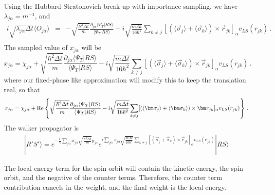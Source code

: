 Using the Hubbard-Stratonovich break up with importance sampling, we have
$\lambda_{j\alpha} = m^{-1}$, and
\begin{eqnarray}
i\sqrt{\lambda_{j\alpha}\Delta t}\langle O_{j\alpha} \rangle
&=& -\sqrt{\frac{\hbar^2 \Delta t}{m}}
\frac{\partial_{j\alpha} \langle \Psi_T |RS\rangle}
{\langle \Psi_T |RS\rangle} +i \sqrt{\frac{m \Delta t}{16 \hbar^2}}
\sum_{k\neq j}[(\langle \vec \sigma_j\rangle+\langle \vec \sigma_k\rangle)\times
\vec r_{jk} ]_{\alpha} v_{LS}(r_{jk})\,.
\nonumber\\
\end{eqnarray}
The sampled value of $x_{j\alpha}$ will be
\begin{equation}
x_{j\alpha} = \chi_{j\alpha} + 
\sqrt{\frac{\hbar^2 \Delta t}{m}}
\frac{\partial_{j\alpha} \langle \Psi_T |RS\rangle}
{\langle \Psi_T |RS\rangle}
-i \sqrt{\frac{m \Delta t}{16 \hbar^2}}
\sum_{k\neq j}[(\langle \vec \sigma_j\rangle+\langle \vec \sigma_k\rangle)\times
\vec r_{jk} ]_{\alpha} v_{LS}(r_{jk})\,.
\end{equation}
where our fixed-phase like approximation
will modify this to keep the translation real, so that
\begin{equation}
x_{j\alpha} = \chi_{j\alpha} +  {\rm Re}\left \{
\sqrt{\frac{\hbar^2 \Delta t}{m}}
\frac{\partial_{j\alpha} \langle \Psi_T |RS\rangle}
{\langle \Psi_T |RS\rangle}
-i \sqrt{\frac{m \Delta t}{16 \hbar^2}}
\sum_{k\neq j}[(\langle \vec \sigma_j\rangle+\langle \vec \sigma_k\rangle)\times
\vec r_{jk} ]_{\alpha} v_{LS}(r_{jk}) \right \}\,.
\end{equation}
The walker propagator is
\begin{eqnarray}
|R'S'\rangle = e^{-\frac{i}{\hbar} \sum_{j\alpha} x_{j\alpha}
\sqrt{\frac{\hbar^2\Delta t}{m}} p_{j\alpha} }
e^{i \sum_{j\alpha} x_{j\alpha} \sqrt{\frac{m \Delta t }{16\hbar^2}}
\sum_{k\neq j}[(\vec \sigma_j+ \vec \sigma_k)\times
\vec r_{jk} ]_{\alpha} v_{LS}(r_{jk}) }  |R S\rangle
\end{eqnarray}

The local energy term for the spin orbit will contain the kinetic energy,
the spin orbit, and the negative of the counter terms. Therefore, the
counter term contribution cancels in the weight, and the final weight is
the local energy. 

